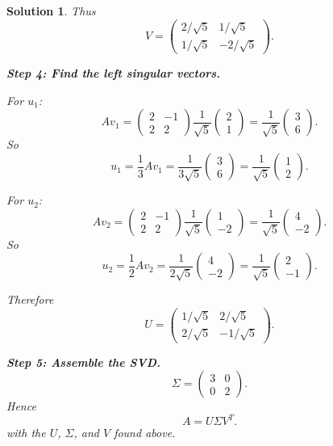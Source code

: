 \documentclass[11pt,a4paper]{article}
\theoremstyle{sol}
\newtheorem*{solution}{Solution}
\begin{document}
\begin{solution}
Thus
\[
V=
\begin{pmatrix}
2/\sqrt5&1/\sqrt5\\
1/\sqrt5&-2/\sqrt5
\end{pmatrix}.
\]

\textbf{Step 4: Find the left singular vectors.}

For $u_1$:
\[
Av_1=
\begin{pmatrix}2&-1\\2&2\end{pmatrix}
\frac{1}{\sqrt5}\begin{pmatrix}2\\1\end{pmatrix}
=\frac{1}{\sqrt5}\begin{pmatrix}3\\6\end{pmatrix}.
\]
So
\[
u_1=\frac{1}{3}Av_1
=\frac{1}{3\sqrt5}\begin{pmatrix}3\\6\end{pmatrix}
=\frac{1}{\sqrt5}\begin{pmatrix}1\\2\end{pmatrix}.
\]

For $u_2$:
\[
Av_2=
\begin{pmatrix}2&-1\\2&2\end{pmatrix}
\frac{1}{\sqrt5}\begin{pmatrix}1\\-2\end{pmatrix}
=\frac{1}{\sqrt5}\begin{pmatrix}4\\-2\end{pmatrix}.
\]
So
\[
u_2=\frac{1}{2}Av_2
=\frac{1}{2\sqrt5}\begin{pmatrix}4\\-2\end{pmatrix}
=\frac{1}{\sqrt5}\begin{pmatrix}2\\-1\end{pmatrix}.
\]

Therefore
\[
U=
\begin{pmatrix}
1/\sqrt5&2/\sqrt5\\
2/\sqrt5&-1/\sqrt5
\end{pmatrix}.
\]

\textbf{Step 5: Assemble the SVD.}
\[
\Sigma=
\begin{pmatrix}
3&0\\
0&2
\end{pmatrix}.
\]
Hence
\[
\boxed{
A=U\Sigma V^T.
}
\]
with the $U$, $\Sigma$, and $V$ found above.
\end{solution}
\end{document}
